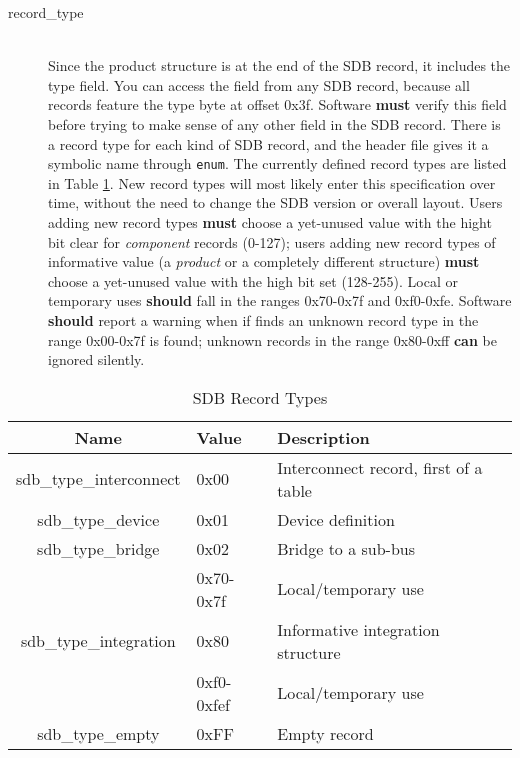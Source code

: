 \documentclass[a4paper, 12pt]{article}
\begin{document}
\begin{description}
\item[record\_type] \hfill \\
Since the product structure is at the end of the SDB record, it includes the
type field. You can access the field from any SDB record, because all records feature
the type byte at offset 0x3f.  Software \textbf{must} verify this field before trying to
make sense of any other field in the SDB record.
There is a record type for each kind
of SDB record, and the header file gives it a symbolic name through \texttt{enum}.
The currently defined record types are listed in Table \ref{record_type}.  New
record types will most likely enter this specification over time, without the need
to change the SDB version or overall layout.  Users adding new record types \textbf{must}
choose a yet-unused value with the hight bit clear for \textit{component} records (0-127);
users adding new record types of informative value (a \textit{product} or a completely
different structure) \textbf{must} choose a yet-unused value with the high bit set (128-255).
Local or temporary uses \textbf{should} fall in the ranges 0x70-0x7f and 0xf0-0xfe.
Software \textbf{should} report a warning when if finds an
unknown record type in the range 0x00-0x7f is found; unknown records in the range 0x80-0xff
\textbf{can} be ignored silently.
\end{description}

\begin{center}
  \begin{savenotes}
    \begin{table}[!ht]\footnotesize
      \caption{SDB Record Types}\label{record_type}\centering
        \begin{tabular}{| c | l | p{6cm} |} \hline
        Name & Value & Description \\ \hline
        sdb\_type\_interconnect & 0x00 & Interconnect record, first of a table \\ \hline
        sdb\_type\_device & 0x01 & Device definition \\ \hline
        sdb\_type\_bridge & 0x02 & Bridge to a sub-bus \\ \hline
        & 0x70-0x7f & Local/temporary use \\ \hline
        sdb\_type\_integration & 0x80 & Informative integration structure \\ \hline
        & 0xf0-0xfef & Local/temporary use \\ \hline
        sdb\_type\_empty & 0xFF & Empty record \\ \hline
        \end{tabular}
    \end{table}
  \end{savenotes}
\end{center}
\end{document}
